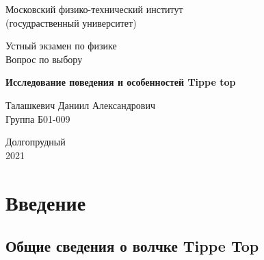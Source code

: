 \documentclass[a4paper,11.5pt]{article} %
\begin{document}


\begin{titlepage}

	\newpage
	\begin{center}
		\normalsize Московский физико-технический институт \\(госудраственный 			университет)
	\end{center}

	\vspace{6em}

	\begin{center}
		\Large Устный экзамен по физике\\Вопрос по выбору
	\end{center}

	\vspace{1em}

	\begin{center}
		\large \textbf{Исследование поведения и особенностей Tippe top}
	\end{center}

	\vspace{2em}

	\begin{center}
		\large Талашкевич Даниил Александрович\\
		Группа Б01-009
	\end{center}

	\vspace{\fill}

	\begin{center}
	Долгопрудный \\2021
	\end{center}
	
\end{titlepage}



	\thispagestyle{empty}
	\newpage
	\tableofcontents
	\newpage
	\setcounter{page}{1}




\section{Введение}


\subsection{Общие сведения о волчке Tippe Top}
\end{document}
